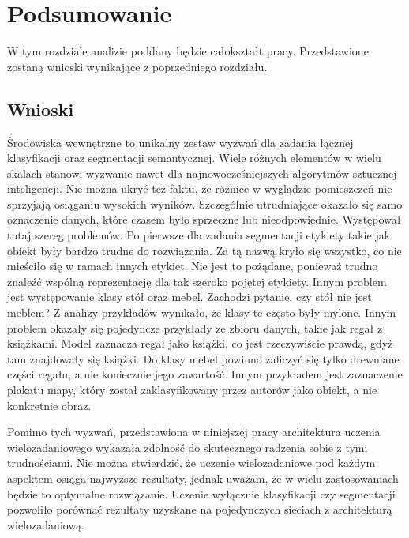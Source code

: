 \clearpage
\newpage %
\section{Podsumowanie}

W tym rozdziale analizie poddany będzie całokształt pracy. Przedstawione zostaną wnioski wynikające z poprzedniego rozdziału. 

\subsection{Wnioski}

Środowiska wewnętrzne to unikalny zestaw wyzwań dla zadania łącznej klasyfikacji oraz segmentacji semantycznej. Wiele różnych elementów w wielu skalach stanowi wyzwanie nawet dla najnowocześniejszych algorytmów sztucznej inteligencji. Nie można ukryć też faktu, że różnice w wyglądzie pomieszczeń nie sprzyjają osiąganiu wysokich wyników. Szczególnie utrudniające okazało się samo oznaczenie danych, które czasem było sprzeczne lub nieodpowiednie. Występował tutaj szereg problemów. Po pierwsze dla zadania segmentacji etykiety takie jak obiekt były bardzo trudne do rozwiązania. Za tą nazwą kryło się wszystko, co nie mieściło się w ramach innych etykiet. Nie jest to pożądane, ponieważ trudno znaleźć wspólną reprezentację dla tak szeroko pojętej etykiety. Innym problem jest występowanie klasy stół oraz mebel. Zachodzi pytanie, czy stół nie jest meblem? Z analizy przykładów wynikało, że klasy te często były mylone. Innym problem okazały się pojedyncze przykłady ze zbioru danych, takie jak regał z książkami. Model zaznacza regał jako książki, co jest rzeczywiście prawdą, gdyż tam znajdowały się książki. Do klasy mebel powinno zaliczyć się tylko drewniane części regału, a nie koniecznie jego zawartość. Innym przykładem jest zaznaczenie plakatu mapy, który został zaklasyfikowany przez autorów jako obiekt, a nie konkretnie obraz.

Pomimo tych wyzwań, przedstawiona w niniejszej pracy architektura uczenia wielozadaniowego wykazała zdolność do skutecznego radzenia sobie z tymi trudnościami. Nie można stwierdzić, że uczenie wielozadaniowe pod każdym aspektem osiąga najwyższe rezultaty, jednak uważam, że w wielu zastosowaniach będzie to optymalne rozwiązanie. Uczenie wyłącznie klasyfikacji czy segmentacji pozwoliło porównać rezultaty uzyskane na pojedynczych sieciach z architekturą wielozadaniową.

